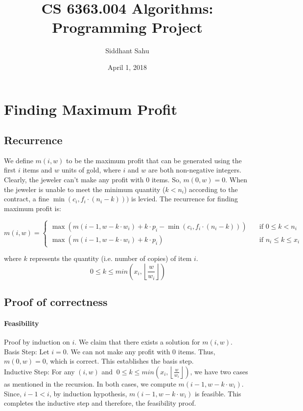 \documentclass{article}
\title{CS 6363.004 Algorithms: Programming Project}
\author{Siddhant Sahu}
\date{April 1, 2018}
\begin{document}
\maketitle

\section{Finding Maximum Profit}

\subsection{Recurrence}
We define $m(i, w)$ to be the maximum profit that can be generated using the first $i$ items and $w$ units of gold, where $i$ and $w$ are both non-negative integers. Clearly, the jeweler can't make any profit with 0 items. So, $m(0, w) = 0$. 
When the jeweler is unable to meet the minimum quantity ($k < n_i$) according to the contract, a fine $\min (c_i, f_i \cdot (n_i - k)))$ is levied. The recurrence for finding maximum profit is:

\[ m(i, w) =
\begin{cases}
\max (m(i-1, w-k \cdot w_i) + k \cdot p_i - \min (c_i, f_i \cdot (n_i - k)))       & \quad \text{if } 0 \leq k < n_i\\
\max (m(i-1, w-k \cdot w_i) + k \cdot p_i)  & \quad \text{if } n_i \leq k \leq x_i
\end{cases}
\]

where $k$ represents the quantity (i.e. number of copies) of item $i$.
$$\ 0 \leq k \leq min\left(x_i, \left\lfloor\frac{w}{w_i}\right\rfloor\right)$$

\subsection{Proof of correctness}

\paragraph{Feasibility}
Proof by induction on $i$. We claim that there exists a solution for $m(i, w)$.\\
Basis Step: Let $i = 0$. We can not make any profit with 0 items. Thus, $m(0, w) = 0$, which is correct. This establishes the basis step.\\
Inductive Step: For any $(i, w)$ and $\ 0 \leq k \leq min\left(x_i, \left\lfloor\frac{w}{w_i}\right\rfloor\right)$, we have two cases as mentioned in the recursion. In both cases, we compute $m(i-1, w-k \cdot w_i)$. Since, $i-1 < i$, by induction hypothesis, $m(i-1, w-k \cdot w_i)$ is feasible. This completes the inductive step and therefore, the feasibility proof.
\end{document}
